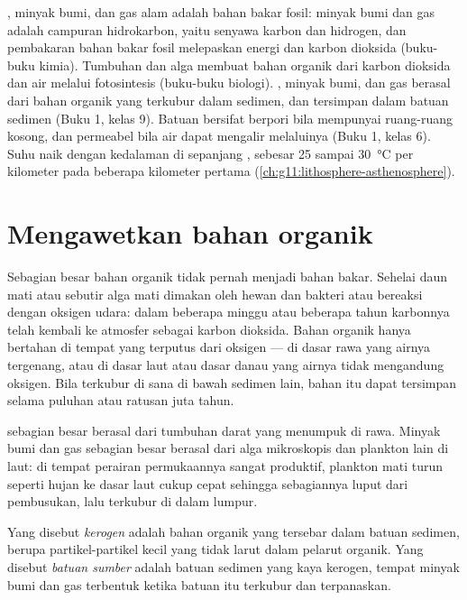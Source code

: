 \begin{recall}
, minyak bumi, dan gas alam adalah bahan bakar fosil: minyak bumi dan
gas adalah campuran hidrokarbon, yaitu senyawa karbon dan hidrogen, dan
pembakaran bahan bakar fosil melepaskan energi dan karbon dioksida (buku-buku
kimia). Tumbuhan dan alga membuat bahan organik dari karbon dioksida dan air
melalui fotosintesis (buku-buku biologi). , minyak bumi, dan gas
berasal dari bahan organik yang terkubur dalam sedimen, dan tersimpan dalam
batuan sedimen (Buku 1, kelas 9). Batuan bersifat berpori bila mempunyai
ruang-ruang kosong, dan permeabel bila air dapat mengalir melaluinya (Buku 1,
kelas 6). Suhu naik dengan kedalaman di sepanjang , sebesar 25 sampai
\qty{30}{\degreeCelsius} per kilometer pada beberapa kilometer pertama
(\cref{ch:g11:lithosphere-asthenosphere}).
\end{recall}

\section{Mengawetkan bahan organik}

Sebagian besar bahan organik tidak pernah menjadi bahan bakar. Sehelai daun
mati atau sebutir alga mati dimakan oleh hewan dan bakteri atau bereaksi dengan
oksigen udara: dalam beberapa minggu atau beberapa tahun karbonnya telah
kembali ke atmosfer sebagai karbon dioksida. Bahan organik hanya bertahan di
tempat yang terputus dari oksigen --- di dasar rawa yang airnya tergenang, atau
di dasar laut atau dasar danau yang airnya tidak mengandung oksigen. Bila
terkubur di sana di bawah sedimen lain, bahan itu dapat tersimpan selama
puluhan atau ratusan juta tahun.

 sebagian besar berasal dari tumbuhan darat yang menumpuk di rawa.
Minyak bumi dan gas sebagian besar berasal dari alga mikroskopis dan plankton
lain di laut: di tempat perairan permukaannya sangat produktif, plankton mati
turun seperti hujan ke dasar laut cukup cepat sehingga sebagiannya luput dari
pembusukan, lalu terkubur di dalam lumpur.

\begin{definition}\label{def:g11:fossil-fuel-geology:source-rock}
Yang disebut \emph{kerogen} adalah bahan organik yang tersebar
dalam batuan sedimen, berupa partikel-partikel kecil yang tidak larut dalam
pelarut organik. Yang disebut \emph{batuan sumber} adalah
batuan sedimen yang kaya kerogen, tempat minyak bumi dan gas terbentuk ketika
batuan itu terkubur dan terpanaskan.
\end{definition}

